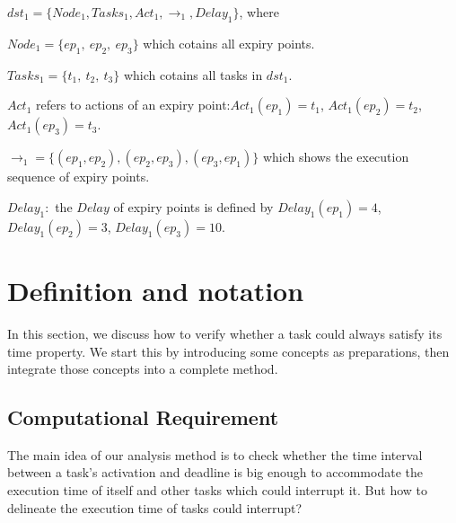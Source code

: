 \documentclass[conference]{IEEEtran}
\begin{document}
$dst_1=\{Node_1,Tasks_1,Act_1,\rightarrow_1,Delay_1\}$, where 
\begin{compactitem}
\item $Node_1=\{ep_1,\ ep_2,\ ep_3\}$ which cotains all expiry points.
\item $Tasks_1=\{t_1,\ t_2,\ t_3\}$ which cotains all tasks in $dst_1$.
\item $Act_1$ refers to actions of an expiry point:$Act_1(ep_1)=t_1$, $Act_1(ep_2)=t_2$, $Act_1(ep_3)=t_3$.
\item $\rightarrow_1=\{(ep_1,ep_2),(ep_2,ep_3),(ep_3,ep_1)\}$ which shows the execution sequence of expiry points.
\item $Delay_1:$ the $Delay$ of expiry points is defined by $Delay_1(ep_1)=4$, $Delay_1(ep_2)=3$, $Delay_1(ep_3)=10$.
\end{compactitem}


\section{Definition and notation}\label{section_definition}
In this section, we discuss how to verify whether a task could always satisfy its time property. We start this by introducing some concepts as preparations, then integrate those concepts into a complete method.

\subsection{Computational Requirement}
The main idea of our analysis method is to check whether the time interval between a task's activation and deadline is big enough to accommodate the execution time of itself and other tasks which could interrupt it. But how to delineate the execution time of tasks could interrupt?
\end{document}
